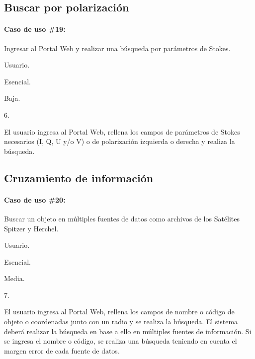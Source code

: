 \subsection*{Buscar por polarización}

\paragraph{Caso de uso \#19:}

\begin{description}[noitemsep]
        \item[Objetivo] Ingresar al Portal Web y realizar una búsqueda por parámetros de Stokes.
        \item[Actor] Usuario.
        \item[Necesidad] Esencial.
        \item[Prioridad] Baja.
        \item[Requerimientos Referenciados] 6.
        \item[Descripción] El usuario ingresa al Portal Web, rellena los campos de parámetros de Stokes necesarios (I, Q, U y/o V) o de polarización izquierda o derecha y realiza la búsqueda.
\end{description}


\subsection*{Cruzamiento de información}

\paragraph{Caso de uso \#20:}

\begin{description}[noitemsep]
        \item[Objetivo] Buscar un objeto en múltiples fuentes de datos como archivos de los Satélites Spitzer y Herchel.
        \item[Actor] Usuario.
        \item[Necesidad] Esencial.
        \item[Prioridad] Media.
        \item[Requerimientos Referenciados] 7.
        \item[Descripción] El usuario ingresa al Portal Web, rellena los campos de nombre o código de objeto o coordenadas junto con un radio y se realiza la búsqueda. El sistema deberá realizar la búsqueda en base a ello en múltiples fuentes de información. Si se ingresa el nombre o código, se realiza una búsqueda teniendo en cuenta el margen error de cada fuente de datos.
\end{description}


